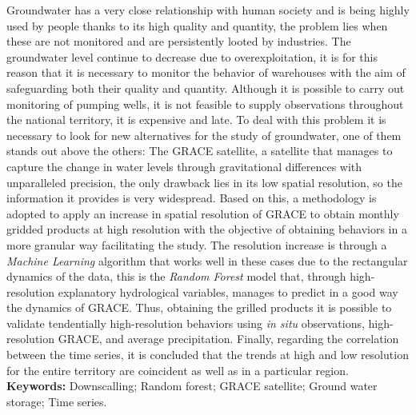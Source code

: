 Groundwater has a very close relationship with human society and is being highly used by people thanks to its
high quality and quantity, the problem lies when these are not monitored and are persistently looted by industries. The groundwater level continue to decrease due to overexploitation, it is for this reason that it is necessary to monitor the behavior of
warehouses with the aim of safeguarding both their quality and quantity. Although it is possible to carry out monitoring of pumping wells, it is not
feasible to supply observations throughout the national territory, it is expensive and late. To deal with this problem it is necessary to look for new alternatives for the study of
groundwater, one of them stands out above the others: The GRACE satellite, a satellite that manages to capture the change in water levels through gravitational differences with unparalleled precision,
the only drawback lies in its low spatial resolution, so the information it provides is very
widespread. Based on this, a methodology is adopted to apply an increase in spatial resolution of GRACE to obtain monthly gridded products at high resolution with the
objective of obtaining behaviors in a more granular way facilitating the study. The resolution increase is through a \textit{Machine Learning} algorithm that works well in these cases
due to the rectangular dynamics of the data, this is the \textit{Random Forest} model that, through high-resolution explanatory hydrological variables, manages to predict in a good way
the dynamics of GRACE. Thus, obtaining the grilled products it is possible to validate tendentially
high-resolution behaviors using \textit{in situ} observations, high-resolution GRACE, and average precipitation.
Finally, regarding the correlation between the time series, it is concluded that the trends at high and low resolution for the entire territory are coincident as well as in a particular region.
\vskip 0.2in
\noindent
{\bf Keywords:} Downscalling; Random forest; GRACE satellite; Ground water storage; Time series.
